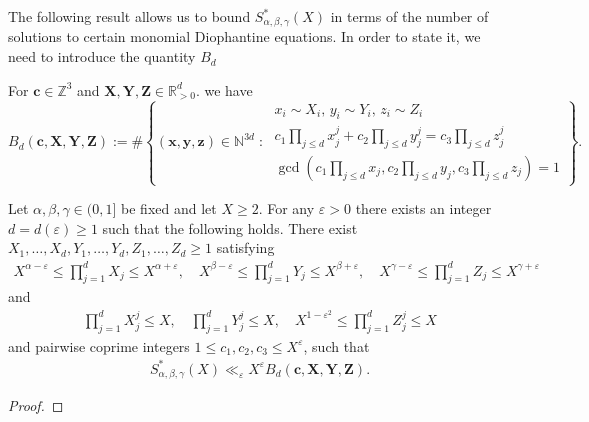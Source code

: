 The following result allows us to bound $S^*_{\alpha,\beta,\gamma}(X)$
in terms of the number of solutions to certain monomial Diophantine equations. In order to state it, we need to introduce the quantity $B_d$
\begin{definition}\label{def:BdDiophantineCount}
For $\mathbf{c}\in \mathbb{Z}^3$ and $\mathbf{X},\mathbf{Y},\mathbf{Z}\in \mathbb{R}_{>0}^{d}$. we have
\begin{equation}\label{eq:Bk}
B_d(\mathbf{c},\mathbf{X},\mathbf{Y},\mathbf{Z}) := \#\left\{(\mathbf{x},\mathbf{y},\mathbf{z})\in \mathbb{N}^{3d}\;:\;
\begin{array}{l}
x_i\sim X_i,\,y_i\sim Y_i,\,z_i\sim Z_i \\
c_1\prod_{j\leq d}x_j^j+c_2\prod_{j\leq d}y_j^j=c_3\prod_{j\leq d}z_j^j\\
\gcd(c_1\prod_{j\leq d}x_j,c_2\prod_{j\leq d}y_j ,
c_3\prod_{j\leq d}z_j)=1
\end{array}
\right\}.
\end{equation}
\end{definition}




\begin{proposition}\label{prop:DiophantineReduction}
Let $\alpha,\beta,\gamma\in (0,1]$ be fixed and let $X\geq 2$. For any $\varepsilon>0$ there exists an integer $d=d(\varepsilon)\geq 1$ such that the following holds.
There exist $X_1,\ldots, X_d,Y_1,\ldots, Y_d, Z_1,\ldots, Z_d\geq 1$ satisfying
\begin{align}\label{eq:xiyizi_1}
X^{\alpha-\varepsilon}\leq \prod_{j=1}^{d}X_j\leq X^{\alpha+\varepsilon},\quad
X^{\beta-\varepsilon}\leq\prod_{j=1}^{d}Y_j\leq X^{\beta+\varepsilon},\quad
X^{\gamma-\varepsilon}\leq\prod_{j=1}^{d}Z_j\leq X^{\gamma+\varepsilon}
\end{align}
and
\begin{align}\label{eq:xiyizi_2}
\prod_{j=1}^d X_j^j \leq X, \quad \prod_{j=1}^d Y_j^j\leq X,\quad X^{1-\varepsilon^2}\leq \prod_{j=1}^d Z_j^j\leq X
\end{align}
and pairwise coprime integers $1\leq c_1,c_2,c_3\leq X^{\varepsilon}$, such that
\begin{align*}
S^*_{\alpha,\beta,\gamma}(X) \ll_{\varepsilon} X^{\varepsilon}B_d(\mathbf{c},\mathbf{X},\mathbf{Y},\mathbf{Z}).
\end{align*}
\end{proposition}
\begin{proof}
\end{proof}


